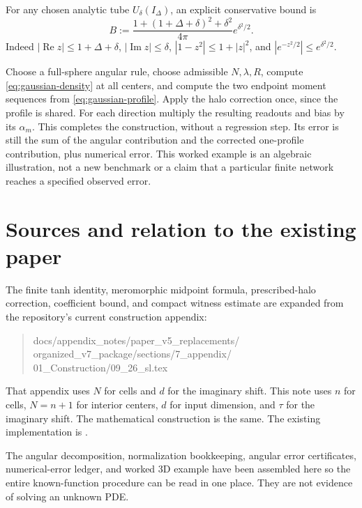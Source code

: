 \documentclass[11pt]{article}
\newcommand{\Imag}{\operatorname{Im}}
\newcommand{\Real}{\operatorname{Re}}
\begin{document}
For any chosen analytic tube $U_\delta(I_\Delta)$, an explicit conservative bound is
\[
 B:=\frac{1+(1+\Delta+\delta)^2+\delta^2}{4\pi}e^{\delta^2/2}.
\]
Indeed $|\Real z|\le1+\Delta+\delta$, $|\Imag z|\le\delta$,
$|1-z^2|\le1+|z|^2$, and $|e^{-z^2/2}|\le e^{\delta^2/2}$.

Choose a full-sphere angular rule, choose admissible $N,\lambda,R$, compute \eqref{eq:gaussian-density} at all centers, and compute the two endpoint moment sequences from \eqref{eq:gaussian-profile}. Apply the halo correction once, since the profile is shared. For each direction multiply the resulting readouts and bias by its $\alpha_m$. This completes the construction, without a regression step. Its error is still the sum of the angular contribution and the corrected one-profile contribution, plus numerical error. This worked example is an algebraic illustration, not a new benchmark or a claim that a particular finite network reaches a specified observed error.

\section{Sources and relation to the existing paper}

The finite tanh identity, meromorphic midpoint formula, prescribed-halo correction, coefficient bound, and compact witness estimate are expanded from the repository's current construction appendix:
\begin{quote}\small\ttfamily
docs/appendix\_notes/paper\_v5\_replacements/\\
organized\_v7\_package/sections/7\_appendix/\\
01\_Construction/09\_26\_sl.tex
\end{quote}
That appendix uses $N$ for cells and $d$ for the imaginary shift. This note uses $n$ for cells, $N=n+1$ for interior centers, $d$ for input dimension, and $\tau$ for the imaginary shift. The mathematical construction is the same. The existing implementation is
.

The angular decomposition, normalization bookkeeping, angular error certificates, numerical-error ledger, and worked 3D example have been assembled here so the entire known-function procedure can be read in one place. They are not evidence of solving an unknown PDE.
\end{document}
